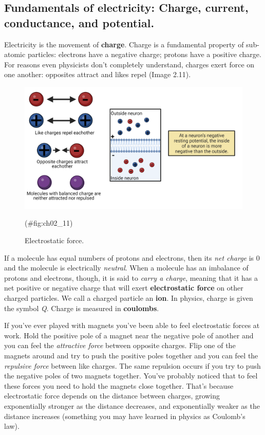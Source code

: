 \documentclass[
]{book}
\begin{document}
\hypertarget{fundamentals-of-electricity-charge-current-conductance-and-potential.}{%
\subsection{Fundamentals of electricity: Charge, current, conductance, and potential.}\label{fundamentals-of-electricity-charge-current-conductance-and-potential.}}

Electricity is the movement of \textbf{charge}. Charge is a fundamental property of sub-atomic particles: electrons have a negative charge; protons have a positive charge. For reasons even physicists don't completely understand, charges exert force on one another: opposites attract and likes repel (Image 2.11).

\begin{figure}

{\centering \includegraphics[width=0.8\linewidth]{images/ch02/02_11} 

}

\caption{Electrostatic force.}(\#fig:ch02_11)
\end{figure}

If a molecule has equal numbers of protons and electrons, then its \emph{net charge} is 0 and the molecule is electrically \emph{neutral}. When a molecule has an imbalance of protons and electrons, though, it is said to \emph{carry a charge}, meaning that it has a net positive or negative charge that will exert \textbf{electrostatic force} on other charged particles. We call a charged particle an \textbf{ion}. In physics, charge is given the symbol \emph{Q}. Charge is measured in \textbf{coulombs}.

If you've ever played with magnets you've been able to feel electrostatic forces at work. Hold the positive pole of a magnet near the negative pole of another and you can feel the \emph{attractive force} between opposite charges. Flip one of the magnets around and try to push the positive poles together and you can feel the \emph{repulsive force} between like charges. The same repulsion occurs if you try to push the negative poles of two magnets together. You've probably noticed that to feel these forces you need to hold the magnets close together. That's because electrostatic force depends on the distance between charges, growing exponentially stronger as the distance decreases, and exponentially weaker as the distance increases (something you may have learned in physics as Coulomb's law).
\end{document}
